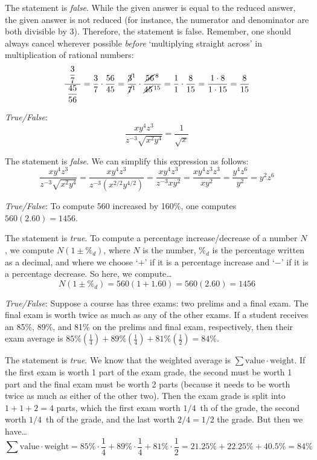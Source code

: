 \documentclass[11pt,letterpaper]{article}
\begin{document}
\sol The statement is \textit{false}. While the given answer is equal to the reduced answer, the given answer is not reduced (for instance, the numerator and denominator are both divisible by 3). Therefore, the statement is false. Remember, one should always cancel wherever possible \textit{before} `multiplying straight across' in multiplication of rational numbers:
	\[
	\dfrac{\;\;\dfrac{3}{7}\;\;}{\dfrac{45}{56}}= \dfrac{3}{7} \cdot \dfrac{56}{45}= \dfrac{\cancel{3}^1}{\cancel{7}^1} \cdot \dfrac{\cancel{56}^{\,8}}{\cancel{45}^{\,15}}= \dfrac{1}{1} \cdot \dfrac{8}{15}= \dfrac{1 \cdot 8}{1 \cdot 15}= \dfrac{8}{15}
	\] 





\newpage





\quizsol \textit{True/False}: 
	\[
	\dfrac{x y^4 z^3}{z^{-3} \sqrt{x^2 y^4}}= \dfrac{1}{\sqrt{x}}
	\] \pspace

\sol The statement is \textit{false}. We can simplify this expression as follows:
	\[
	\dfrac{x y^4 z^3}{z^{-3} \sqrt{x^2 y^4}}= \dfrac{x y^4 z^3}{z^{-3} (x^{2/2} y^{4/2})}= \dfrac{x y^4 z^3}{z^{-3} x y^2}= \dfrac{x y^4 z^3 z^3}{x y^2}= \dfrac{y^4 z^6}{y^2}= y^2 z^6
	\] \pvspace{1.2cm}



\quizsol \textit{True/False}: To compute 560 increased by 160\%, one computes $560(2.60)= 1456$. \pspace

\sol The statement is \textit{true}. To compute a percentage increase/decrease of a number $N$, we compute $N(1 \pm \%_d)$, where $N$ is the number, $\%_d$ is the percentage written as a decimal, and where we choose `$+$' if it is a percentage increase and `$-$' if it is a percentage decrease. So here, we compute\dots
	\[
	N(1 \pm \%_d)= 560(1 + 1.60)= 560(2.60)= 1456
	\] \pvspace{1.2cm}



\quizsol \textit{True/False}: Suppose a course has three exams: two prelims and a final exam. The final exam is worth twice as much as any of the other exams. If a student receives an 85\%, 89\%, and 81\% on the prelims and final exam, respectively, then their exam average is $85\% \left( \frac{1}{4} \right) + 89\%  \left( \frac{1}{4} \right) +  81\% \left( \frac{1}{2} \right)= 84\%$. \pspace

\sol The statement is \textit{true}. We know that the weighted average is $\sum \text{value} \cdot \text{weight}$. If the first exam is worth 1 part of the exam grade, the second must be worth 1 part and the final exam must be worth 2 parts (because it needs to be worth twice as much as either of the other two). Then the exam grade is split into $1 + 1 + 2= 4$ parts, which the first exam worth $1/4$~th of the grade, the second worth $1/4$~th of the grade, and the last worth $2/4= 1/2$ the grade. But then we have\dots
	\[
	\sum \text{value} \cdot \text{weight}= 85\% \cdot \frac{1}{4} + 89\% \cdot \frac{1}{4} + 81\% \cdot \frac{1}{2}= 21.25\% + 22.25\% + 40.5\%= 84\%
	\] \pvspace{1.2cm}
\end{document}
